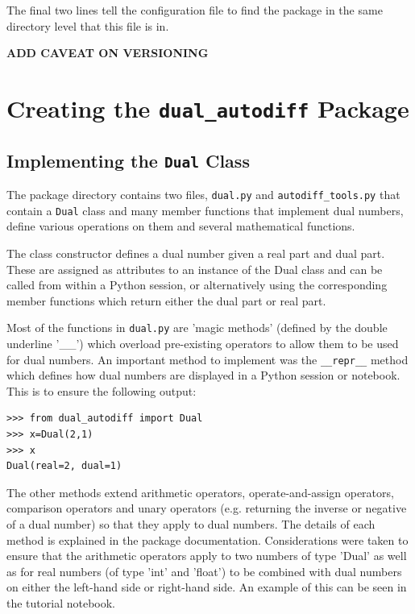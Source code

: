 \documentclass{article}
\begin{document}
The final two lines tell the configuration file to find the package in the same directory level that this file is in.

\textbf{ADD CAVEAT ON VERSIONING}

\section{ Creating the \texttt{dual\_autodiff} Package}

\subsection{Implementing the \texttt{Dual} Class}

The package directory contains two files, \texttt{dual.py} and \texttt{autodiff\_tools.py} that contain a \texttt{Dual} class and many member functions that implement dual numbers, define various operations on them and several mathematical functions. 

The class constructor defines a dual number given a real part and dual part. These are assigned as attributes to an instance of the Dual class and can be called from within a Python session, or alternatively using the corresponding member functions which return either the dual part or real part. 

Most of the functions in \texttt{dual.py} are 'magic methods' (defined by the double underline '\_\_') which overload pre-existing operators to allow them to be used for dual numbers. An important method to implement was the \texttt{\_\_repr\_\_} method which defines how dual numbers are displayed in a Python session or notebook. This is to ensure the following output: 

\begin{lstlisting}
>>> from dual_autodiff import Dual
>>> x=Dual(2,1)
>>> x
Dual(real=2, dual=1)
\end{lstlisting}

The other methods extend arithmetic operators, operate-and-assign operators, comparison operators and unary operators (e.g. returning the inverse or negative of a dual number) so that they apply to dual numbers. The details of each method is explained in the package documentation. Considerations were taken to ensure that the arithmetic operators apply to two numbers of type 'Dual' as well as for real numbers (of type 'int' and 'float') to be combined with dual numbers on either the left-hand side or right-hand side. An example of this can be seen in the tutorial notebook.
\end{document}
